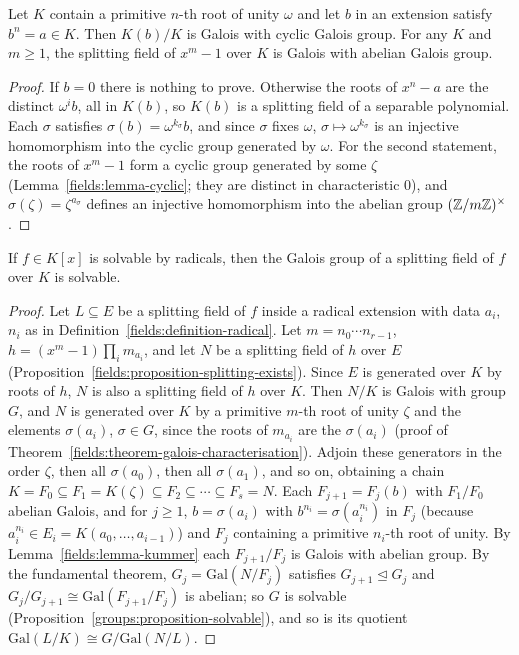 \begin{lemma}\label{fields:lemma-kummer}
Let $K$ contain a primitive $n$-th root of unity $\omega$ and let $b$ in an extension satisfy
$b^n = a \in K$. Then $K(b)/K$ is Galois with cyclic Galois group. For any $K$ and $m \geq 1$, the
splitting field of $x^m - 1$ over $K$ is Galois with abelian Galois group.
\end{lemma}

\begin{proof}
If $b = 0$ there is nothing to prove. Otherwise the roots of $x^n - a$ are the distinct
$\omega^i b$, all in $K(b)$, so $K(b)$ is a splitting field of a separable polynomial. Each $\sigma$
satisfies $\sigma(b) = \omega^{k_\sigma}b$, and since $\sigma$ fixes $\omega$, $\sigma \mapsto \omega^{k_\sigma}$ is an injective
homomorphism into the cyclic group generated by $\omega$. For the second statement, the roots
of $x^m - 1$ form a cyclic group generated by some $\zeta$ (Lemma~\ref{fields:lemma-cyclic};
they are distinct in characteristic $0$), and $\sigma(\zeta) = \zeta^{a_\sigma}$ defines an injective
homomorphism into the abelian group $(\mathbb{Z}/m\mathbb{Z})^\times$.
\end{proof}

\begin{theorem}[Galois]\label{fields:theorem-galois-radicals}
If $f \in K[x]$ is solvable by radicals, then the Galois group of a splitting field of $f$ over $K$
is solvable.
\end{theorem}

\begin{proof}
Let $L \subseteq E$ be a splitting field of $f$ inside a radical extension with data $a_i$, $n_i$ as in
Definition~\ref{fields:definition-radical}. Let $m = n_0 \cdots n_{r-1}$, $h = (x^m - 1)\prod_i m_{a_i}$, and
let $N$ be a splitting field of $h$ over $E$ (Proposition~\ref{fields:proposition-splitting-exists}).
Since $E$ is generated over $K$ by roots of $h$, $N$ is also a splitting field of $h$ over $K$.
Then $N/K$ is Galois with group $G$, and $N$ is generated over $K$ by a primitive $m$-th root of unity $\zeta$ and the elements
$\sigma(a_i)$, $\sigma \in G$, since the roots of $m_{a_i}$ are the $\sigma(a_i)$ (proof of
Theorem~\ref{fields:theorem-galois-characterisation}). Adjoin these generators in the order
$\zeta$, then all $\sigma(a_0)$, then all $\sigma(a_1)$, and so on, obtaining a chain
$K = F_0 \subseteq F_1 = K(\zeta) \subseteq F_2 \subseteq \cdots \subseteq F_s = N$. Each $F_{j+1} = F_j(b)$ with $F_1/F_0$
abelian Galois, and for $j \geq 1$, $b = \sigma(a_i)$ with $b^{n_i} = \sigma(a_i^{n_i})$ in $F_j$ (because
$a_i^{n_i} \in E_i = K(a_0, \ldots, a_{i-1})$) and $F_j$ containing a primitive $n_i$-th root of unity. By
Lemma~\ref{fields:lemma-kummer} each $F_{j+1}/F_j$ is Galois with abelian group. By the fundamental
theorem, $G_j = \mathrm{Gal}(N/F_j)$ satisfies $G_{j+1} \trianglelefteq G_j$ and
$G_j/G_{j+1} \cong \mathrm{Gal}(F_{j+1}/F_j)$ is abelian; so $G$ is solvable
(Proposition~\ref{groups:proposition-solvable}), and so is its quotient
$\mathrm{Gal}(L/K) \cong G/\mathrm{Gal}(N/L)$.
\end{proof}

